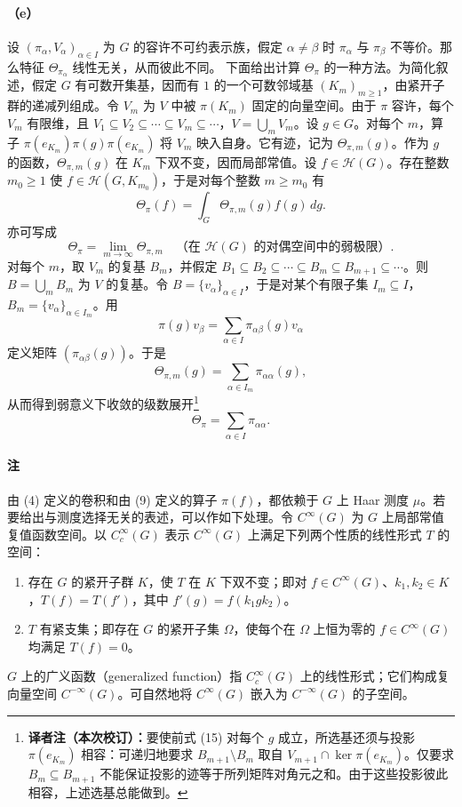 \paragraph*{（e）}
设 $(\pi_\alpha,V_\alpha)_{\alpha\in I}$ 为 $G$ 的容许不可约表示族，假定 $\alpha\ne\beta$ 时 $\pi_\alpha$ 与 $\pi_\beta$ 不等价。那么特征 $\Theta_{\pi_\alpha}$ 线性无关，从而彼此不同。
下面给出计算 $\Theta_\pi$ 的一种方法。为简化叙述，假定 $G$ 有可数开集基，因而有 $1$ 的一个可数邻域基 $(K_m)_{m\geq1}$，由紧开子群的递减列组成。令 $V_m$ 为 $V$ 中被 $\pi(K_m)$ 固定的向量空间。由于 $\pi$ 容许，每个 $V_m$ 有限维，且 $V_1\subseteq V_2\subseteq\cdots\subseteq V_m\subseteq\cdots$，$V=\bigcup_mV_m$。设 $g\in G$。对每个 $m$，算子 $\pi(e_{K_m})\pi(g)\pi(e_{K_m})$ 将 $V_m$ 映入自身。它有迹，记为 $\Theta_{\pi,m}(g)$。作为 $g$ 的函数，$\Theta_{\pi,m}(g)$ 在 $K_m$ 下双不变，因而局部常值。设 $f\in\mathcal H(G)$。存在整数 $m_0\geq1$ 使 $f\in\mathcal H(G,K_{m_0})$，于是对每个整数 $m\geq m_0$ 有
\[
\Theta_\pi(f)=\int_G\Theta_{\pi,m}(g)f(g)\,dg.\tag{12}
\]
亦可写成
\[
\Theta_\pi=\lim_{m\to\infty}\Theta_{\pi,m}\quad\text{（在 }\mathcal H(G)\text{ 的对偶空间中的弱极限）}.\tag{13}
\]
对每个 $m$，取 $V_m$ 的复基 $B_m$，并假定 $B_1\subseteq B_2\subseteq\cdots\subseteq B_m\subseteq B_{m+1}\subseteq\cdots$。则 $B=\bigcup_mB_m$ 为 $V$ 的复基。令 $B=\{v_\alpha\}_{\alpha\in I}$，于是对某个有限子集 $I_m\subseteq I$，$B_m=\{v_\alpha\}_{\alpha\in I_m}$。用
\[
\pi(g)v_\beta=\sum_{\alpha\in I}\pi_{\alpha\beta}(g)v_\alpha\tag{14}
\]
定义矩阵 $(\pi_{\alpha\beta}(g))$。于是
\[
\Theta_{\pi,m}(g)=\sum_{\alpha\in I_m}\pi_{\alpha\alpha}(g),\tag{15}
\]
从而得到弱意义下收敛的级数展开\footnote{\textbf{译者注（本次校订）：}要使前式 (15) 对每个 $g$ 成立，所选基还须与投影 $\pi(e_{K_m})$ 相容：可递归地要求 $B_{m+1}\setminus B_m$ 取自 $V_{m+1}\cap\ker\pi(e_{K_m})$。仅要求 $B_m\subseteq B_{m+1}$ 不能保证投影的迹等于所列矩阵对角元之和。由于这些投影彼此相容，上述选基总能做到。}
\[
\Theta_\pi=\sum_{\alpha\in I}\pi_{\alpha\alpha}.\tag{16}
\]
\paragraph*{注}
由 (4) 定义的卷积和由 (9) 定义的算子 $\pi(f)$，都依赖于 $G$ 上 Haar 测度 $\mu$。若要给出与测度选择无关的表述，可以作如下处理。令 $C^\infty(G)$ 为 $G$ 上局部常值复值函数空间。以 $C_c^\infty(G)$ 表示 $C^\infty(G)$ 上满足下列两个性质的线性形式 $T$ 的空间：
\begin{enumerate}
\item[(1)] 存在 $G$ 的紧开子群 $K$，使 $T$ 在 $K$ 下双不变；即对 $f\in C^\infty(G)$、$k_1,k_2\in K$，$T(f)=T(f')$，其中 $f'(g)=f(k_1gk_2)$。
\item[(2)] $T$ 有紧支集；即存在 $G$ 的紧开子集 $\Omega$，使每个在 $\Omega$ 上恒为零的 $f\in C^\infty(G)$ 均满足 $T(f)=0$。
\end{enumerate}
$G$ 上的广义函数（generalized function）指 $C_c^\infty(G)$ 上的线性形式；它们构成复向量空间 $C^{-\infty}(G)$。可自然地将 $C^\infty(G)$ 嵌入为 $C^{-\infty}(G)$ 的子空间。

